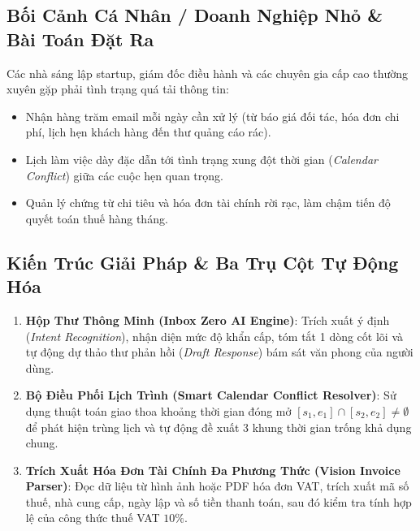 \subsection{Bối Cảnh Cá Nhân / Doanh Nghiệp Nhỏ \& Bài Toán Đặt Ra}
Các nhà sáng lập startup, giám đốc điều hành và các chuyên gia cấp cao thường xuyên gặp phải tình trạng quá tải thông tin:
\begin{itemize}
  \item Nhận hàng trăm email mỗi ngày cần xử lý (từ báo giá đối tác, hóa đơn chi phí, lịch hẹn khách hàng đến thư quảng cáo rác).
  \item Lịch làm việc dày đặc dẫn tới tình trạng xung đột thời gian (\textit{Calendar Conflict}) giữa các cuộc hẹn quan trọng.
  \item Quản lý chứng từ chi tiêu và hóa đơn tài chính rời rạc, làm chậm tiến độ quyết toán thuế hàng tháng.
\end{itemize}

\subsection{Kiến Trúc Giải Pháp \& Ba Trụ Cột Tự Động Hóa}
\begin{enumerate}
  \item \textbf{Hộp Thư Thông Minh (Inbox Zero AI Engine)}: Trích xuất ý định (\textit{Intent Recognition}), nhận diện mức độ khẩn cấp, tóm tắt 1 dòng cốt lõi và tự động dự thảo thư phản hồi (\textit{Draft Response}) bám sát văn phong của người dùng.
  \item \textbf{Bộ Điều Phối Lịch Trình (Smart Calendar Conflict Resolver)}: Sử dụng thuật toán giao thoa khoảng thời gian đóng mở $[s_1, e_1] \cap [s_2, e_2] \neq \emptyset$ để phát hiện trùng lịch và tự động đề xuất 3 khung thời gian trống khả dụng chung.
  \item \textbf{Trích Xuất Hóa Đơn Tài Chính Đa Phương Thức (Vision Invoice Parser)}: Đọc dữ liệu từ hình ảnh hoặc PDF hóa đơn VAT, trích xuất mã số thuế, nhà cung cấp, ngày lập và số tiền thanh toán, sau đó kiểm tra tính hợp lệ của công thức thuế VAT $10\%$.
\end{enumerate}


